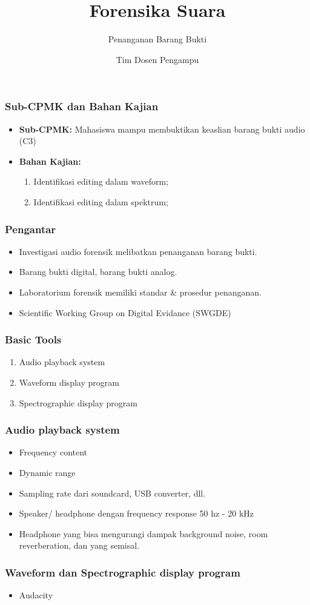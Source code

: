 \documentclass[pdflatex,compress,mathserif]{beamer}
\title{Forensika Suara}
\subtitle{Penanganan Barang Bukti}
\author{Tim Dosen Pengampu}
\begin{document}
\maketitle

\begin{frame}
	\frametitle{Sub-CPMK dan Bahan Kajian}
	\begin{itemize}
		\item \textbf{Sub-CPMK:} Mahasiswa mampu membuktikan keaslian barang bukti audio (C3)
		\item \textbf{Bahan Kajian:}
		\begin{enumerate}
			\item Identifikasi editing dalam waveform;
			\item Identifikasi editing dalam spektrum;
		\end{enumerate}
	\end{itemize}
\end{frame}

\begin{frame}
	\frametitle{Pengantar}
	\begin{itemize}
		\item Investigasi audio forensik melibatkan penanganan barang bukti.
		\item Barang bukti digital, barang bukti analog.
		\item Laboratorium forensik memiliki standar \& prosedur penanganan.
		\item Scientific Working Group on Digital Evidance (SWGDE)
	\end{itemize}
\end{frame}


\begin{frame}
	\frametitle{Basic Tools}
	\begin{enumerate}
		\item Audio playback system
		\item Waveform display program
		\item Spectrographic display program
	\end{enumerate}
\end{frame}

\begin{frame}
	\frametitle{Audio playback system}
	\begin{itemize}
		\item Frequency content
		\item Dynamic range
		\item Sampling rate dari soundcard, USB converter, dll.
		\item Speaker/ headphone dengan frequency response 50 hz - 20 kHz
		\item Headphone yang bisa mengurangi dampak background noise, room reverberation, dan yang semisal.
	\end{itemize}
\end{frame}

\begin{frame}
	\frametitle{Waveform dan Spectrographic display program}
	\begin{itemize}
		\item Audacity \href{https://www.audacityteam.org/download/}{}
	\end{itemize}
\end{frame}
\end{document}
